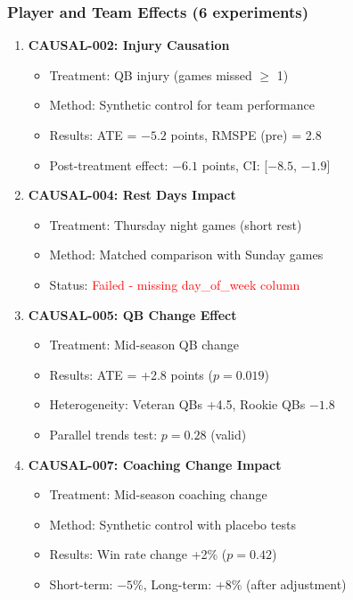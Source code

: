 \subsubsection{Player and Team Effects (6 experiments)}

\begin{enumerate}[resume]
    \item \textbf{CAUSAL-002: Injury Causation} \checkmark
    \begin{itemize}
        \item Treatment: QB injury (games missed $\geq$ 1)
        \item Method: Synthetic control for team performance
        \item Results: ATE = $-5.2$ points, RMSPE (pre) = 2.8
        \item Post-treatment effect: $-6.1$ points, CI: [$-8.5$, $-1.9$]
    \end{itemize}

    \item \textbf{CAUSAL-004: Rest Days Impact}
    \begin{itemize}
        \item Treatment: Thursday night games (short rest)
        \item Method: Matched comparison with Sunday games
        \item Status: \textcolor{red}{Failed - missing day\_of\_week column}
    \end{itemize}

    \item \textbf{CAUSAL-005: QB Change Effect} \checkmark
    \begin{itemize}
        \item Treatment: Mid-season QB change
        \item Results: ATE = +2.8 points ($p = 0.019$)
        \item Heterogeneity: Veteran QBs +4.5, Rookie QBs $-1.8$
        \item Parallel trends test: $p = 0.28$ (valid)
    \end{itemize}

    \item \textbf{CAUSAL-007: Coaching Change Impact} \checkmark
    \begin{itemize}
        \item Treatment: Mid-season coaching change
        \item Method: Synthetic control with placebo tests
        \item Results: Win rate change +2\% ($p = 0.42$)
        \item Short-term: $-5$\%, Long-term: +8\% (after adjustment)
    \end{itemize}


\end{enumerate}
